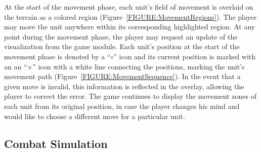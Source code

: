 \documentclass[review]{vgtc}                 %
\begin{document}
At the start of the movement phase, each unit's field of movement is
overlaid on the terrain as a colored region 
(Figure~\ref{FIGURE:MovementRegions}).  The player may move the unit
anywhere within its corresponding highlighted region.  At any point
during the movement phase, the player may request an update of the
visualization from the game module.
Each unit's position at the start of the movement phase is denoted by
a ``$\circ$'' icon and its current position is marked with an an
``$\times$'' icon with a white line connecting the positions, marking
the unit's movement path (Figure~\ref{FIGURE:MovementSequence}).
In the event that a given move is invalid, this information is
reflected in the overlay, allowing the player to correct the error.
The game continues to display the movement zones of each unit from its
original position, in case the player changes his mind and would like
to choose a different move for a particular unit.

\subsection{Combat Simulation}
\label{SECTION:CombatSimulation}
\end{document}
